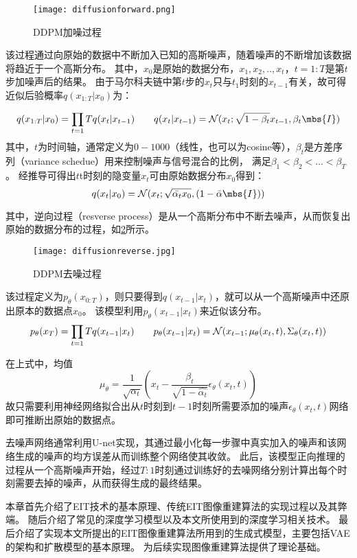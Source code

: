 \begin{figure}[h]
  \texttt{[image: diffusionforward.png]}
  \caption{DDPM加噪过程}
  \label{figure:Diffusionforward}
\end{figure}

该过程通过向原始的数据中不断加入已知的高斯噪声，随着噪声的不断增加该数据将趋近于一个高斯分布。
其中，$x_0$是原始的数据分布，$x_1, x_2,..,x_t$，$t=1:T$是第$t$步加噪声后的结果。
由于马尔科夫链中第$t$步的$x_t$只与$t_1$时刻的$x_{t-1}$有关，故可得近似后验概率$q(x_{1:T}|x_0)$为：

\begin{equation}
  \centering
  q(x_{1:T}|x_0) = \prod_{t=1}{T} q(x_t|x_{t-1}) \qquad
  q(x_t|x_{t-1}) = \mathcal{N}(x_t; \sqrt{1-\beta_t}x_{t-1}, \beta_t\mbs{I})
\end{equation}
其中，$t$为时间轴，通常定义为$0-1000$（线性，也可以为cosine等），$\beta_t$是方差序列（variance schedue）用来控制噪声与信号混合的比例，
满足$\beta_1 < \beta_2 <...<\beta_T$。
经推导\cite{DDPM}可得出$t$t时刻的隐变量$x_t$可由原始数据分布$x_0$得到：
\begin{equation}
  \centering
  q(x_t|x_0) = \mathcal{N}(x_t; \sqrt{\bar{\alpha_t}x_0}, (1-\bar{\alpha}\mbs{I}))
\end{equation}

其中，逆向过程（resverse process）是从一个高斯分布中不断去噪声，从而恢复出原始的数据分布的过程，如\cref{figure:Diffusionreverse}所示。

\begin{figure}[h]
  \centering
  \texttt{[image: diffusionreverse.jpg]}
  \caption{DDPM去噪过程}
  \label{figure:Diffusionreverse}
\end{figure}

该过程定义为$p_\theta(x_{0:T})$，则只要得到$q(x_{t-1}|x_t)$，就可以从一个高斯噪声中还原出原本的数据点$x_0$。
该模型利用$p_\theta(x_{t-1}|x_{t})$来近似该分布。
\begin{equation}
  \centering
  p_\theta(x_{T}) = \prod_{t=1}{T} q(x_{t-1}|x_{t}) \qquad
  p_\theta(x_{t-1}|x_{t}) = \mathcal{N}(x_{t-1}; \mu_\theta(x_t, t), \Sigma_\theta(x_t, t))
\end{equation}

在上式中，均值
\begin{equation}
  \mu_\theta = \frac{1}{\sqrt{\alpha_t}}(x_t - \frac{\beta_t}{\sqrt{1-\hat{\alpha_t}}}\epsilon_\theta(x_t, t))  
\end{equation}
故只需要利用神经网络拟合出从$t$时刻到$t-1$时刻所需要添加的噪声$\epsilon_\theta(x_t, t)$网络即可推断出原始的数据点。

去噪声网络通常利用U-net实现，其通过最小化每一步骤中真实加入的噪声和该网络生成的噪声的均方误差从而训练整个网络使其收敛。
此后，该模型正向推理的过程从一个高斯噪声开始，经过$T:1$时刻通过训练好的去噪网络分别计算出每个时刻需要去掉的噪声，从而获得生成的最终结果。


本章首先介绍了EIT技术的基本原理、传统EIT图像重建算法的实现过程以及其弊端。
随后介绍了常见的深度学习模型以及本文所使用到的深度学习相关技术。
最后介绍了实现本文所提出的EIT图像重建算法所用到的生成式模型，主要包括VAE的架构和扩散模型的基本原理。
为后续实现图像重建算法提供了理论基础。
